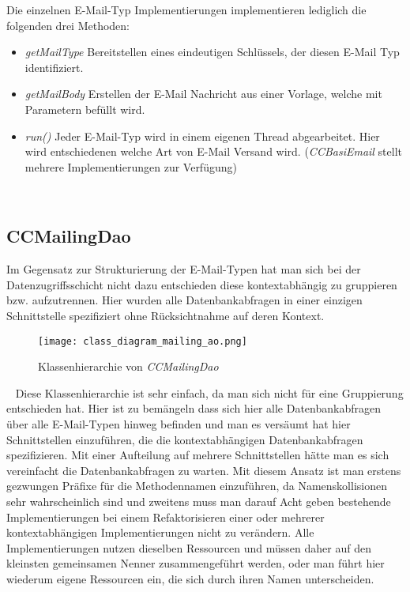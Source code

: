 \newpage
Die einzelnen E-Mail-Typ Implementierungen implementieren lediglich die folgenden drei Methoden:
\begin{itemize}
	\item\emph{getMailType}
	\newline
	Bereitstellen eines eindeutigen Schlüssels, der diesen E-Mail Typ identifiziert.
	\item\emph{getMailBody}
	\newline
	Erstellen der E-Mail Nachricht aus einer Vorlage, welche mit Parametern befüllt wird.
	\item\emph{run()}
	\newline
	Jeder E-Mail-Typ wird in einem eigenen Thread abgearbeitet. Hier wird entschiedenen welche Art von E-Mail Versand wird. (\emph{CCBasiEmail} stellt mehrere Implementierungen zur Verfügung)	
	\end{itemize}
\ \newpage
\subsection{CCMailingDao}
Im Gegensatz zur Strukturierung der E-Mail-Typen hat man sich bei der Datenzugriffsschicht nicht dazu entschieden diese kontextabhängig zu gruppieren bzw. aufzutrennen. Hier wurden alle Datenbankabfragen in einer einzigen Schnittstelle spezifiziert ohne Rücksichtnahme auf deren Kontext.
\newline
\begin{figure}[h]
\centering
\texttt{[image: class\_diagram\_mailing\_ao.png]} 
\caption{Klassenhierarchie von \emph{CCMailingDao}}
\label{fig:klassen-hierarchie-ccmailingdao}
\end{figure}
\ \newline
Diese Klassenhierarchie ist sehr einfach, da man sich nicht für eine Gruppierung entschieden hat. Hier ist zu bemängeln dass sich hier alle Datenbankabfragen über alle E-Mail-Typen hinweg befinden und man es versäumt hat hier Schnittstellen einzuführen, die die kontextabhängigen Datenbankabfragen spezifizieren. Mit einer Aufteilung auf mehrere Schnittstellen hätte man es sich vereinfacht die Datenbankabfragen zu warten. Mit diesem Ansatz ist man erstens gezwungen Präfixe für die Methodennamen einzuführen, da Namenskollisionen sehr wahrscheinlich sind und zweitens muss man darauf Acht geben bestehende Implementierungen bei einem Refaktorisieren einer oder mehrerer kontextabhängigen Implementierungen nicht zu verändern. Alle Implementierungen nutzen dieselben Ressourcen und müssen daher auf den kleinsten gemeinsamen Nenner zusammengeführt werden, oder man führt hier wiederum eigene Ressourcen ein, die sich durch ihren Namen unterscheiden.
\newpage
